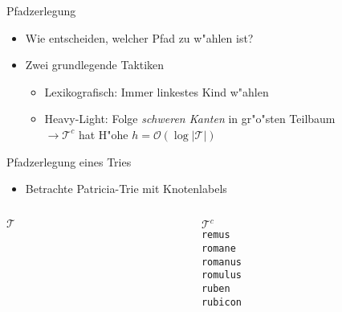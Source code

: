 \documentclass[ngerman,hyperref={pdfpagelabels=true}]{beamer}
\newcommand\T{\mathcal{T}}
\begin{document}
\begin{frame}{Pfadzerlegung}
\begin{itemize}
\item Wie entscheiden, welcher Pfad zu w"ahlen ist?
\item Zwei grundlegende Taktiken
\begin{itemize}
\item Lexikografisch: Immer linkestes Kind w"ahlen
\item Heavy-Light: Folge \emph{schweren Kanten} in gr"o"sten Teilbaum
\\$\rightarrow \T^c$ hat H"ohe $h = \mathcal{O}(\log |\T|)$
\end{itemize}
\end{itemize}
\end{frame}

\newcommand{\edgelabel}[2]{edge from parent node[draw=none,#1]{\lstinline|#2|}}

\begin{frame}{Pfadzerlegung eines Tries}
\begin{itemize}
\item Betrachte Patricia-Trie mit Knotenlabels
\end{itemize}

\begin{columns}[T] %
\begin{column}{.48\textwidth}

\centering
$\T$ \\[1em]


\end{column}%
\hfill%
\begin{column}{.48\textwidth}

$\T^c$ \\


\lstinline|remus| \\
\lstinline|romane| \\
\lstinline|romanus| \\
\lstinline|romulus| \\
\lstinline|ruben| \\
\lstinline|rubicon| \\

\end{column}
\end{columns}

\end{frame}
\end{document}
